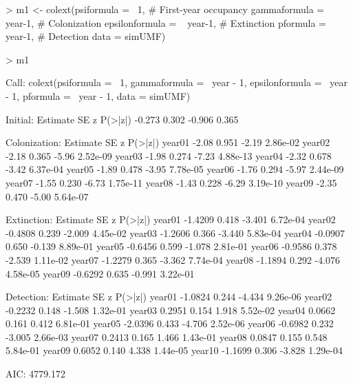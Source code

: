 \documentclass[12pt]{article}
\renewenvironment{Schunk}{\vspace{\topsep}}{\vspace{\topsep}}
\begin{document}
\begin{small}

\begin{Schunk}
\begin{Sinput}
> m1 <- colext(psiformula = ~1,   # First-year occupancy
     gammaformula = ~ year-1,    # Colonization
     epsilonformula = ~ year-1,  # Extinction
     pformula = ~ year-1,        # Detection
     data = simUMF)
\end{Sinput}
\end{Schunk}
\begin{Schunk}
\begin{Sinput}
> m1
\end{Sinput}
\begin{Soutput}
Call:
colext(psiformula = ~1, gammaformula = ~year - 1, epsilonformula = ~year - 
    1, pformula = ~year - 1, data = simUMF)

Initial:
 Estimate    SE      z P(>|z|)
   -0.273 0.302 -0.906   0.365

Colonization:
       Estimate    SE     z  P(>|z|)
year01    -2.08 0.951 -2.19 2.86e-02
year02    -2.18 0.365 -5.96 2.52e-09
year03    -1.98 0.274 -7.23 4.88e-13
year04    -2.32 0.678 -3.42 6.37e-04
year05    -1.89 0.478 -3.95 7.78e-05
year06    -1.76 0.294 -5.97 2.44e-09
year07    -1.55 0.230 -6.73 1.75e-11
year08    -1.43 0.228 -6.29 3.19e-10
year09    -2.35 0.470 -5.00 5.64e-07

Extinction:
       Estimate    SE      z  P(>|z|)
year01  -1.4209 0.418 -3.401 6.72e-04
year02  -0.4808 0.239 -2.009 4.45e-02
year03  -1.2606 0.366 -3.440 5.83e-04
year04  -0.0907 0.650 -0.139 8.89e-01
year05  -0.6456 0.599 -1.078 2.81e-01
year06  -0.9586 0.378 -2.539 1.11e-02
year07  -1.2279 0.365 -3.362 7.74e-04
year08  -1.1894 0.292 -4.076 4.58e-05
year09  -0.6292 0.635 -0.991 3.22e-01

Detection:
       Estimate    SE      z  P(>|z|)
year01  -1.0824 0.244 -4.434 9.26e-06
year02  -0.2232 0.148 -1.508 1.32e-01
year03   0.2951 0.154  1.918 5.52e-02
year04   0.0662 0.161  0.412 6.81e-01
year05  -2.0396 0.433 -4.706 2.52e-06
year06  -0.6982 0.232 -3.005 2.66e-03
year07   0.2413 0.165  1.466 1.43e-01
year08   0.0847 0.155  0.548 5.84e-01
year09   0.6052 0.140  4.338 1.44e-05
year10  -1.1699 0.306 -3.828 1.29e-04

AIC: 4779.172 
\end{Soutput}
\end{Schunk}
\end{small}
\end{document}

